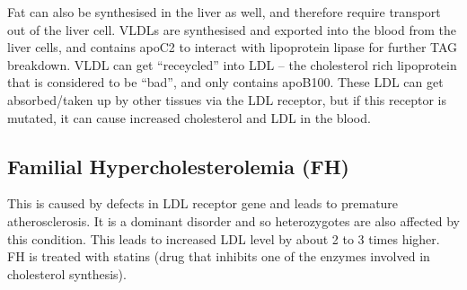 Fat can also be synthesised in the liver as well, and therefore require transport out of the liver cell.
VLDLs are synthesised and exported into the blood from the liver cells, and contains apoC2 to interact with lipoprotein lipase for further TAG breakdown.
VLDL can get ``receycled'' into LDL -- the cholesterol rich lipoprotein that is considered to be ``bad'', and only contains apoB100.
These LDL can get absorbed/taken up by other tissues via  the LDL receptor, but if this receptor is mutated, it can cause increased cholesterol and LDL in the blood.

\subsection{Familial Hypercholesterolemia (FH)}

This is caused by defects in LDL receptor gene and leads to premature atherosclerosis.
It is a dominant disorder and so heterozygotes are also affected by this condition.
This leads to increased LDL level by about 2 to 3 times higher.
FH is treated with statins (drug that inhibits one of the enzymes involved in cholesterol synthesis).

